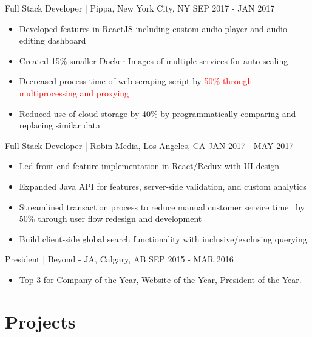\documentclass[]{friggeri-cv}
\begin{document}
\begin{entrylist}
	\entry
	{Full Stack Developer | \normalfont Pippa, New York City, NY}
	{SEP 2017 - JAN 2017}
	{
		\begin{itemize}[leftmargin=*]\itemsep0.1cm
			\vspace{-0.3cm}
			\item Developed features in ReactJS including { custom audio player} and audio-editing dashboard \
			\item Created {15\% smaller} Docker Images of multiple services for auto-scaling
			\item Decreased process time of web-scraping script by \textcolor{red}{50\% through multiprocessing and proxying}
			\item {\addfontfeature{Color=red}Reduced use of cloud storage by 40\%} by programmatically comparing and replacing similar data 
		\end{itemize}
	}
	\entry
	{Full Stack Developer | \normalfont Robin Media, Los Angeles, CA}
	{JAN 2017 - MAY 2017}
	{
		\begin{itemize}[leftmargin=*]\itemsep0.1cm
			\vspace{-0.3cm}
			\item Led front-end feature implementation in React/Redux with UI design 
			\item Expanded Java API for features, server-side validation, and custom analytics
			\item {Streamlined transaction process} to reduce manual customer service time \  {by 50\%} through user flow redesign and development \
			\item Build client-side {\addfontfeature{Color=red}global search functionality} with inclusive/exclusing querying
		\end{itemize}
	}
	\entry
	{President | \normalfont Beyond - JA, Calgary, AB}
	{SEP 2015 - MAR 2016}
	{
		\begin{itemize}[leftmargin=*]\itemsep0.1cm
			\vspace{-0.3cm}
			\item {Top 3} for Company of the Year, Website of the Year, President of the Year.
		\end{itemize}
	}
\end{entrylist}

\section{Projects}
\end{document}
